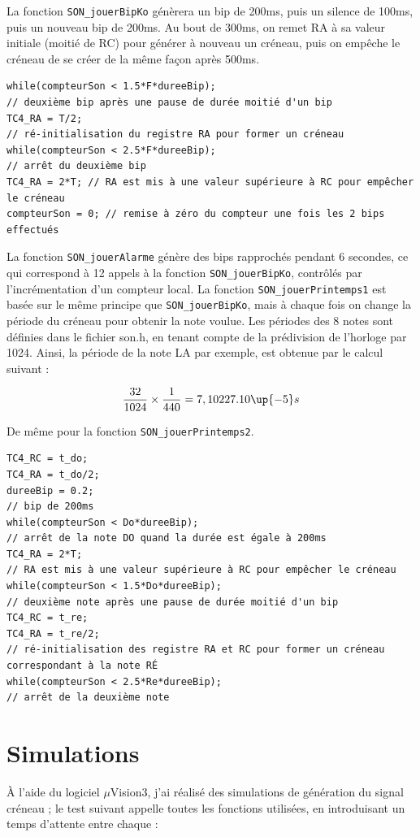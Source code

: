 \documentclass[a4paper]{report}
\begin{document}
La fonction \texttt{SON\_jouerBipKo} génèrera un bip de 200ms, puis un silence de 100ms, puis un nouveau bip de 200ms.
Au bout de 300ms, on remet RA à sa valeur initiale (moitié de RC) pour générer à nouveau un créneau, puis on empêche le créneau de se créer de la même façon après 500ms.

\begin{verbatim}
while(compteurSon < 1.5*F*dureeBip);
// deuxième bip après une pause de durée moitié d'un bip
TC4_RA = T/2;
// ré-initialisation du registre RA pour former un créneau
while(compteurSon < 2.5*F*dureeBip);
// arrêt du deuxième bip
TC4_RA = 2*T; // RA est mis à une valeur supérieure à RC pour empêcher le créneau
compteurSon = 0; // remise à zéro du compteur une fois les 2 bips effectués
\end{verbatim}

La fonction \texttt{SON\_jouerAlarme} génère des bips rapprochés pendant 6 secondes, ce qui correspond à 12 appels à la fonction \texttt{SON\_jouerBipKo}, contrôlés par l'incrémentation d'un compteur local.
La fonction \texttt{SON\_jouerPrintemps1} est basée sur le même principe que \texttt{SON\_jouerBipKo}, mais à chaque fois on change la période du créneau pour obtenir la note voulue.
Les périodes des 8 notes sont définies dans le fichier son.h, en tenant compte de la prédivision de l'horloge par 1024.
Ainsi, la période de la note LA par exemple, est obtenue par le calcul suivant :

\[
{32 \over 1024} \times {1 \over 440} = 7,10227.10\up{-5} s
\]

De même pour la fonction \texttt{SON\_jouerPrintemps2}.

\begin{verbatim}
TC4_RC = t_do;
TC4_RA = t_do/2;
dureeBip = 0.2;
// bip de 200ms
while(compteurSon < Do*dureeBip);
// arrêt de la note DO quand la durée est égale à 200ms
TC4_RA = 2*T;
// RA est mis à une valeur supérieure à RC pour empêcher le créneau
while(compteurSon < 1.5*Do*dureeBip);
// deuxième note après une pause de durée moitié d'un bip
TC4_RC = t_re;
TC4_RA = t_re/2;
// ré-initialisation des registre RA et RC pour former un créneau
correspondant à la note RÉ
while(compteurSon < 2.5*Re*dureeBip);
// arrêt de la deuxième note
\end{verbatim}

\section{Simulations}
À l'aide du logiciel $\mu$Vision3, j'ai réalisé des simulations de génération du signal créneau ;
le test suivant appelle toutes les fonctions utilisées, en introduisant un temps d'attente entre chaque :
\end{document}

